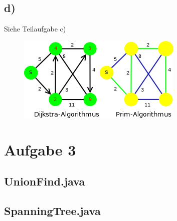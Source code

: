 \documentclass[a4paper,11pt,twoside]{scrartcl}
\begin{document}
\subsection*{d)}
Siehe Teilaufgabe c)
\begin{figure}[H]
	\centering
	\includegraphics*[scale=0.75]{Bilder/2c_Unterschied}
\end{figure}

\clearpage
\vspace*{-50pt}
\section*{Aufgabe 3}
\subsection*{UnionFind.java}

\pagebreak
\subsection*{SpanningTree.java}

\end{document}
